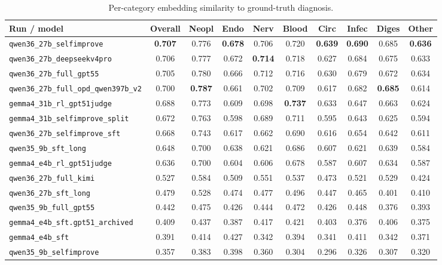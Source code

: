 \documentclass[10pt]{article}
\begin{document}
\begin{table}[htbp]
\centering
\small
\setlength{\tabcolsep}{4pt}
\caption{Per-category embedding similarity to ground-truth diagnosis.}
\label{tab:embed}
\begin{tabular}{lccccccccc}
\toprule
Run / model & Overall & Neopl & Endo & Nerv & Blood & Circ & Infec & Diges & Other \\
\midrule
\texttt{qwen36\_27b\_selfimprove} & \textbf{0.707} & 0.776 & \textbf{0.678} & 0.706 & 0.720 & \textbf{0.639} & \textbf{0.690} & 0.685 & \textbf{0.636} \\
\texttt{qwen36\_27b\_deepseekv4pro} & 0.706 & 0.777 & 0.672 & \textbf{0.714} & 0.718 & 0.627 & 0.684 & 0.675 & 0.633 \\
\texttt{qwen36\_27b\_full\_gpt55} & 0.705 & 0.780 & 0.666 & 0.712 & 0.716 & 0.630 & 0.679 & 0.672 & 0.634 \\
\texttt{qwen36\_27b\_full\_opd\_qwen397b\_v2} & 0.700 & \textbf{0.787} & 0.661 & 0.702 & 0.709 & 0.617 & 0.682 & \textbf{0.685} & 0.614 \\
\texttt{gemma4\_31b\_rl\_gpt51judge} & 0.688 & 0.773 & 0.609 & 0.698 & \textbf{0.737} & 0.633 & 0.647 & 0.663 & 0.624 \\
\texttt{gemma4\_31b\_selfimprove\_split} & 0.672 & 0.763 & 0.598 & 0.689 & 0.711 & 0.595 & 0.643 & 0.625 & 0.594 \\
\texttt{qwen36\_27b\_selfimprove\_sft} & 0.668 & 0.743 & 0.617 & 0.662 & 0.690 & 0.616 & 0.654 & 0.642 & 0.611 \\
\texttt{qwen35\_9b\_sft\_long} & 0.648 & 0.700 & 0.638 & 0.621 & 0.686 & 0.607 & 0.621 & 0.639 & 0.584 \\
\texttt{gemma4\_e4b\_rl\_gpt51judge} & 0.636 & 0.700 & 0.604 & 0.606 & 0.678 & 0.587 & 0.607 & 0.634 & 0.587 \\
\texttt{qwen36\_27b\_full\_kimi} & 0.527 & 0.584 & 0.509 & 0.551 & 0.537 & 0.473 & 0.521 & 0.529 & 0.424 \\
\texttt{qwen36\_27b\_sft\_long} & 0.479 & 0.528 & 0.474 & 0.477 & 0.496 & 0.447 & 0.465 & 0.401 & 0.410 \\
\texttt{qwen35\_9b\_full\_gpt55} & 0.442 & 0.475 & 0.426 & 0.444 & 0.472 & 0.426 & 0.448 & 0.376 & 0.393 \\
\texttt{gemma4\_e4b\_sft.gpt51\_archived} & 0.409 & 0.437 & 0.387 & 0.417 & 0.421 & 0.403 & 0.376 & 0.406 & 0.375 \\
\texttt{gemma4\_e4b\_sft} & 0.391 & 0.414 & 0.427 & 0.342 & 0.394 & 0.341 & 0.411 & 0.342 & 0.371 \\
\texttt{qwen35\_9b\_selfimprove} & 0.357 & 0.383 & 0.398 & 0.360 & 0.304 & 0.296 & 0.326 & 0.307 & 0.320 \\
\bottomrule
\end{tabular}
\end{table}
\end{document}
